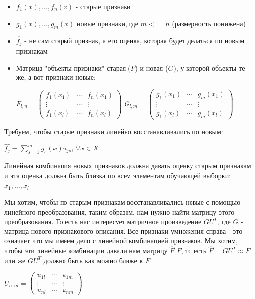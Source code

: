 \begin{itemize}
    \item $f_{1}(x), \dotsc, f_{n}(x)$ - старые признаки
    \item $g_{1}(x), \dots ,g_{m}(x)$ новые признаки, где $m<=n$ (размерность понижена)
    \item $\hat{f_j}$ - не сам старый признак, а его оценка, которая будет делаться по новым признакам
    \item Матрица "объекты-признаки" старая ($F$) и новая ($G$), у которой объекты те же, а вот признаки новые: \par
        $F_{l,n} = 
         \begin{pmatrix}
          f_1(x_1) &  \cdots & f_n(x_1) \\
          \vdots   &  \cdots & \vdots   \\
          f_1(x_l) &  \cdots & f_n(x_l) 
         \end{pmatrix}$ 
        $G_{l,m} = 
         \begin{pmatrix}
          g_1(x_1) &  \cdots & g_m(x_1) \\
          \vdots   &  \cdots & \vdots   \\
          g_1(x_l) &  \cdots & g_m(x_l) 
         \end{pmatrix}$
\end{itemize}

Требуем, чтобы старые признаки линейно восстанавливались по новым:\par
$\hat{f_j} = \displaystyle\sum_{s=1}^{m} g_s(x)u_{js}$, $\forall x \in X$\par Линейная комбинация новых признаков должна давать оценку старым признакам и эта оценка должна быть близка по всем элементам обучающей выборки: $x_1, \dotsc, x_l$

Мы хотим, чтобы по старым признакам восстанавливались новые с помощью линейного преобразования, таким образом, нам нужно найти матрицу этого преобразования. То есть нас интересует матричное произведение $GU^T$, где $G$ - матрица нового признакового описания. Все признаки умножения справа - это означает что мы имеем дело с линейной комбинацией признаков. Мы хотим, чтобы эти линейные комбинации давали нам матрицу $\hat{F}$ \approx $F$, то есть $\hat{F} = GU^T \approx F$ или же $GU^T$ должно быть как можно ближе к $F$ \par
 $U_{n,m} = 
 \begin{pmatrix}
  u_{1l} &  \cdots & u_{1m} \\
  \vdots &  \cdots & \vdots \\
  u_{nl} &  \cdots & u_{nm} 
 \end{pmatrix}$\par

